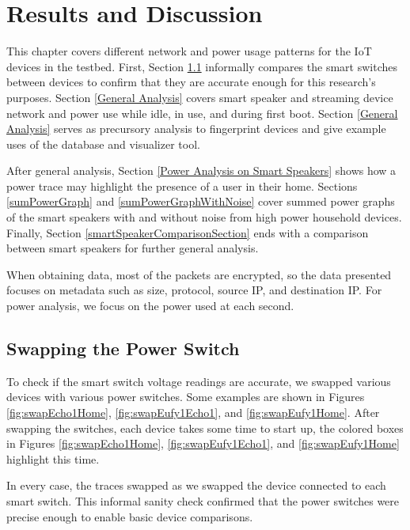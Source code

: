 \chapter{Results and Discussion}
\label{Results}
This chapter covers different network and power usage patterns for the IoT devices in the testbed. First, Section \ref{swappingSwitch} informally compares the smart switches between devices to confirm that they are accurate enough for this research's purposes. Section \ref{General Analysis} covers smart speaker and streaming device network and power use while idle, in use, and during first boot. Section \ref{General Analysis} serves as precursory analysis to fingerprint devices and give example uses of the database and visualizer tool.

After general analysis, Section \ref{Power Analysis on Smart Speakers} shows how a power trace may highlight the presence of a user in their home. Sections \ref{sumPowerGraph} and \ref{sumPowerGraphWithNoise} cover summed power graphs of the smart speakers with and without noise from high power household devices. Finally, Section \ref{smartSpeakerComparisonSection} ends with a comparison between smart speakers for further general analysis.

When obtaining data, most of the packets are encrypted, so the data presented focuses on metadata such as size, protocol, source IP, and destination IP. For power analysis, we focus on the power used at each second.

\section{Swapping the Power Switch}
\label{swappingSwitch}
To check if the smart switch voltage readings are accurate, we swapped various devices with various power switches. Some examples are shown in Figures \ref{fig:swapEcho1Home}, \ref{fig:swapEufy1Echo1}, and \ref{fig:swapEufy1Home}. After swapping the switches, each device takes some time to start up, the colored boxes in Figures \ref{fig:swapEcho1Home}, \ref{fig:swapEufy1Echo1}, and \ref{fig:swapEufy1Home} highlight this time.

In every case, the traces swapped as we swapped the device connected to each smart switch. This informal sanity check confirmed that the power switches were precise enough to enable basic device comparisons.

